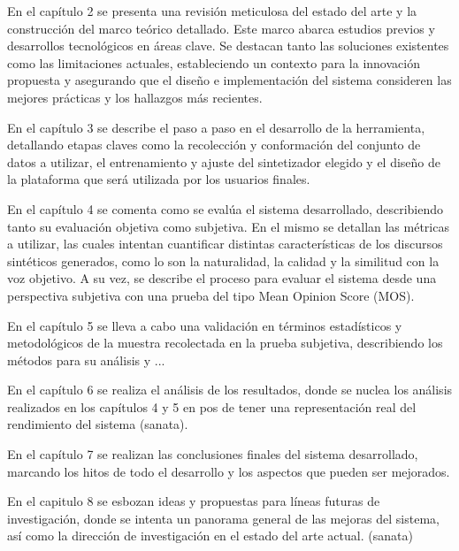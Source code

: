 En el capítulo 2 se presenta una revisión meticulosa del estado del arte y la construcción del marco teórico detallado. Este marco abarca estudios previos y desarrollos tecnológicos en áreas clave. Se destacan tanto las soluciones existentes como las limitaciones actuales, estableciendo un contexto para la innovación propuesta y asegurando que el diseño e implementación del sistema consideren las mejores prácticas y los hallazgos más recientes. 

En el capítulo 3 se describe el paso a paso en el desarrollo de la herramienta, detallando etapas claves como la recolección y conformación del conjunto de datos a utilizar, el entrenamiento y ajuste del sintetizador elegido y el diseño de la plataforma que será utilizada por los usuarios finales.

En el capítulo 4 se comenta como se evalúa el sistema desarrollado, describiendo tanto su evaluación objetiva como subjetiva. En el mismo se detallan las métricas a utilizar, las cuales intentan cuantificar distintas características de los discursos sintéticos generados, como lo son la naturalidad, la calidad y la similitud con la voz objetivo. A su vez, se describe el proceso para evaluar el sistema desde una perspectiva subjetiva con una prueba del tipo Mean Opinion Score (MOS).

En el capítulo 5 se lleva a cabo una validación en términos estadísticos y metodológicos de la muestra recolectada en la prueba subjetiva, describiendo los métodos para su análisis y ...

En el capítulo 6 se realiza el análisis de los resultados, donde se nuclea los análisis realizados en los capítulos 4 y 5 en pos de tener una representación real del rendimiento del sistema (sanata).

En el capítulo 7 se realizan las conclusiones finales del sistema desarrollado, marcando los hitos de todo el desarrollo y los aspectos que pueden ser mejorados.

En el capitulo 8 se esbozan ideas y propuestas para líneas futuras de investigación, donde se intenta un panorama general de las mejoras del sistema, así como la dirección de investigación en el estado del arte actual. (sanata)
